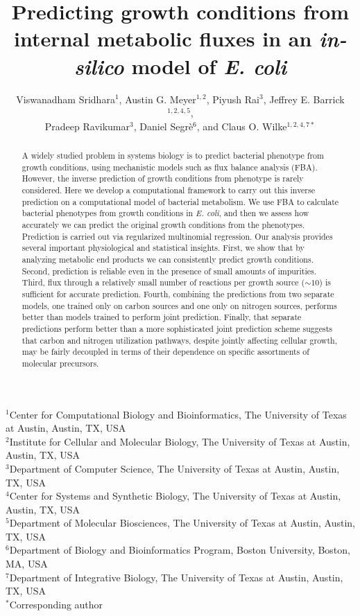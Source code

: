 \documentclass[12pt]{article}
\begin{document}
\title{Predicting growth conditions from internal metabolic fluxes in an \emph{in-silico} model of \emph{E. coli}}

\author{Viswanadham Sridhara$^1$, Austin G. Meyer$^{1,2}$, Piyush Rai$^3$, Jeffrey E. Barrick$^{1,2,4,5}$,\\
Pradeep Ravikumar$^3$, Daniel Segr\`e$^6$, and Claus O. Wilke$^{1,2,4,7*}$}
\maketitle

\noindent
$^1$Center for Computational Biology and Bioinformatics, The University of Texas at Austin, Austin, TX, USA\\
$^2$Institute for Cellular and Molecular Biology, The University of Texas at Austin, Austin, TX, USA\\
$^3$Department of Computer Science, The University of Texas at Austin, Austin, TX, USA\\
$^4$Center for Systems and Synthetic Biology, The University of Texas at Austin, Austin, TX, USA\\
$^5$Department of Molecular Biosciences, The University of Texas at Austin, Austin, TX, USA\\
$^6$Department of Biology and Bioinformatics Program, Boston University, Boston, MA, USA\\
$^7$Department of Integrative Biology, The University of Texas at Austin, Austin, TX, USA\\

\bigskip
\noindent
$^*$Corresponding author

\begin{abstract}
A widely studied problem in systems biology is to predict bacterial phenotype from growth conditions, using mechanistic models such as flux balance analysis (FBA). However, the inverse prediction of growth conditions from phenotype is rarely considered. Here we develop a computational framework to carry out this inverse prediction on a computational model of bacterial metabolism. We use FBA to calculate bacterial phenotypes from growth conditions in \emph{E. coli}, and then we assess how accurately we can predict the original growth conditions from the phenotypes. Prediction is carried out via regularized multinomial regression. Our analysis provides several important physiological and statistical insights. First, we show that by analyzing metabolic end products we can consistently predict growth conditions. Second, prediction is reliable even in the presence of small amounts of impurities. Third, flux through a relatively small number of reactions per growth source ($\mathord{\sim}10$) is sufficient for accurate prediction. Fourth, combining the predictions from two separate models, one trained only on carbon sources and one only on nitrogen sources, performs better than models trained to perform joint prediction. Finally, that separate predictions perform better than a more sophisticated joint prediction scheme suggests that carbon and nitrogen utilization pathways, despite jointly affecting cellular growth, may be fairly decoupled in terms of their dependence on specific assortments of molecular precursors.
\end{abstract}
\end{document}
